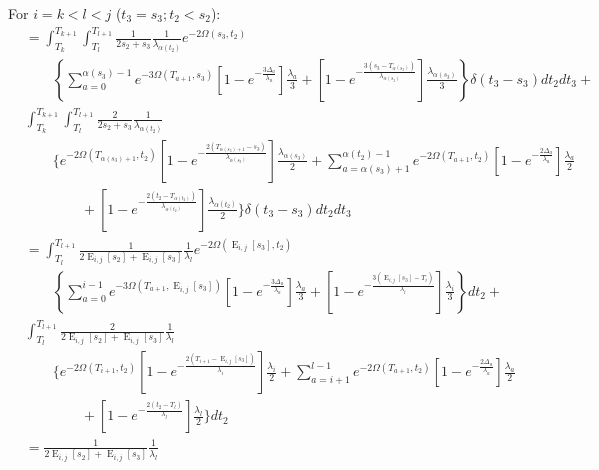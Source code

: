 \documentclass{article}
\DeclareMathOperator{\E}{E}
\begin{document}
For $i=k<l<j$ ($t_3=s_3; t_2<s_2$): %
\begin{align*}
    &=\int_{T_k}^{T_{k+1}}\int_{T_l}^{T_{l+1}}\frac{1}{2s_2+s_3}\frac{1}{\lambda_{\alpha(t_2)}}e^{-2\Omega(s_3,t_2)}\\
    &\qquad\left\{\sum_{a=0}^{\alpha(s_3)-1}e^{-3\Omega(T_{a+1},s_3)}
        \left[1-e^{-\frac{3\Delta_a}{\lambda_a}}\right]\frac{\lambda_a}{3}+
    \left[1-e^{-\frac{3\left(s_3-T_{\alpha(s_3)}\right)}{\lambda_{\alpha(s_3)}}}\right]
        \frac{\lambda_{\alpha(s_3)}}{3}\right\}\delta(t_3-s_3)dt_2dt_3+\\
        &\int_{T_k}^{T_{k+1}}\int_{T_l}^{T_{l+1}}\frac{2}{2s_2+s_3}\frac{1}{\lambda_{\alpha(t_2)}}\\
    &\qquad\Bigg\{e^{-2\Omega(T_{\alpha(s_3)+1},t_2)}\left[1-e^{-\frac{2\left(T_{\alpha(s_3)+1}-s_3\right)}{\lambda_{\alpha(s_3)}}}\right]\frac{\lambda_{\alpha(s_3)}}{2}+\sum_{a=\alpha(s_3)+1}^{\alpha(t_2)-1}e^{-2\Omega\left(T_{a+1},t_2\right)}\left[1-e^{-\frac{2\Delta_a}{\lambda_a}}\right]\frac{\lambda_a}{2}\\
    &\qquad\qquad+\left[1-e^{-\frac{2\left(t_2-T_{\alpha(t_2)}\right)}{\lambda_{\alpha(t_2)}}}\right]\frac{\lambda_{\alpha(t_2)}}{2}
    \Bigg\}\delta(t_3-s_3)dt_2dt_3\\[2em]
    &=\int_{T_l}^{T_{l+1}}\frac{1}{2\E_{i,j}[s_2]+\E_{i,j}[s_3]}\frac{1}{\lambda_l}e^{-2\Omega(\E_{i,j}[s_3],t_2)}\\
    &\qquad\left\{\sum_{a=0}^{i-1}e^{-3\Omega(T_{a+1},\E_{i,j}[s_3])}
        \left[1-e^{-\frac{3\Delta_a}{\lambda_a}}\right]\frac{\lambda_a}{3}+
    \left[1-e^{-\frac{3\left(\E_{i,j}[s_3]-T_{i}\right)}{\lambda_{i}}}\right]
        \frac{\lambda_{i}}{3}\right\}dt_2+\\
        &\int_{T_l}^{T_{l+1}}\frac{2}{2\E_{i,j}[s_2]+\E_{i,j}[s_3]}\frac{1}{\lambda_{l}}\\
    &\qquad\Bigg\{e^{-2\Omega(T_{i+1},t_2)}\left[1-e^{-\frac{2\left(T_{i+1}-\E_{i,j}[s_3]\right)}{\lambda_{i}}}\right]\frac{\lambda_{i}}{2}+\sum_{a=i+1}^{l-1}e^{-2\Omega\left(T_{a+1},t_2\right)}\left[1-e^{-\frac{2\Delta_a}{\lambda_a}}\right]\frac{\lambda_a}{2}\\
    &\qquad\qquad+\left[1-e^{-\frac{2\left(t_2-T_{l}\right)}{\lambda_{l}}}\right]\frac{\lambda_{l}}{2}
    \Bigg\}dt_2\\[2em]
    &=\frac{1}{2\E_{i,j}[s_2]+\E_{i,j}[s_3]}\frac{1}{\lambda_l}\\

\end{align*}
\end{document}
